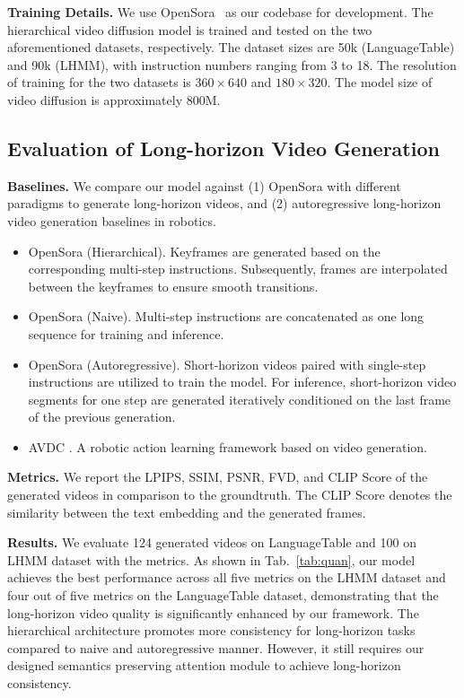 \documentclass[letterpaper, 10 pt, conference]{ieeeconf}  %
\begin{document}
\noindent\textbf{Training Details.} We use OpenSora~\cite{opensora} as our codebase for development. The hierarchical video diffusion model is trained and tested on the two aforementioned datasets, respectively. The dataset sizes are 50k (LanguageTable) and 90k (LHMM), with instruction numbers ranging from 3 to 18. The resolution of training for the two datasets is $360 \times 640$ and $180 \times 320$. %
The model size of video diffusion is approximately 800M.

\subsection{Evaluation of Long-horizon Video Generation}
\label{sec:videoEx}



\noindent\textbf{Baselines.}
We compare our model against (1) OpenSora with different paradigms to generate long-horizon videos, and (2) autoregressive long-horizon video generation baselines in robotics.
\begin{itemize}
    \item OpenSora (Hierarchical). Keyframes are generated based on the corresponding multi-step instructions. Subsequently, frames are interpolated between the keyframes to ensure smooth transitions. 
    \item OpenSora (Naive). Multi-step instructions are concatenated as one long sequence for training and inference.
    \item OpenSora (Autoregressive). Short-horizon videos paired with single-step instructions are utilized to train the model. For inference, short-horizon video segments for one step are generated iteratively conditioned on the last frame of the previous generation.
    \item AVDC \cite{avdc}. A robotic action learning framework based on video generation.
\end{itemize}

\noindent\textbf{Metrics.} We report the LPIPS, SSIM, PSNR, FVD, and CLIP Score of the generated videos in comparison to the groundtruth. The CLIP Score denotes the similarity between the text embedding and the generated frames.

\noindent\textbf{Results.} We evaluate 124 generated videos on LanguageTable and 100 on LHMM dataset with the metrics. As shown in Tab.~\ref{tab:quan}, our model achieves the best performance across all five metrics on the LHMM dataset and four out of five metrics on the LanguageTable dataset, demonstrating that the long-horizon video quality is significantly enhanced by our framework. The hierarchical architecture promotes more consistency for long-horizon tasks compared to naive and autoregressive manner. However, it still requires our designed semantics preserving attention module to achieve long-horizon consistency. 
\end{document}
